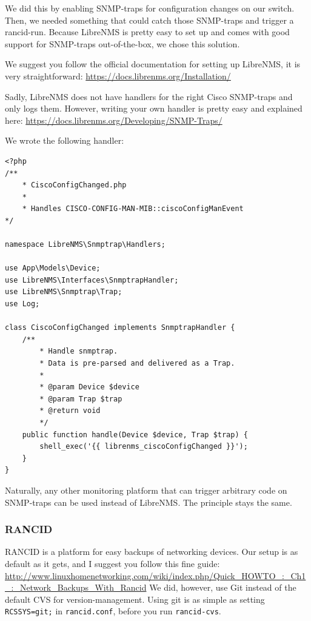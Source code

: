 \documentclass{article}
\begin{document}
We did this by enabling SNMP-traps for configuration changes on our switch.
Then, we needed something that could catch those SNMP-traps and trigger a rancid-run.
Because LibreNMS is pretty easy to set up and comes with good support for SNMP-traps out-of-the-box, we chose this solution.

We suggest you follow the official documentation for setting up LibreNMS,
it is very straightforward: \url{https://docs.librenms.org/Installation/}

Sadly, LibreNMS does not have handlers for the right Cisco SNMP-traps
and only logs them.
However, writing your own handler is pretty easy and explained here:
\url{https://docs.librenms.org/Developing/SNMP-Traps/}

We wrote the following handler:

\begin{minipage}{\linewidth}
\begin{lstlisting}[caption=LibreNMS SnmptrapHandler for CISCO-CONFIG-MAN-MIB::ciscoConfigManEvent]
<?php
/** 
	* CiscoConfigChanged.php
	* 
	* Handles CISCO-CONFIG-MAN-MIB::ciscoConfigManEvent
*/

namespace LibreNMS\Snmptrap\Handlers;

use App\Models\Device;
use LibreNMS\Interfaces\SnmptrapHandler;
use LibreNMS\Snmptrap\Trap;
use Log;

class CiscoConfigChanged implements SnmptrapHandler {
	/**
		* Handle snmptrap.
		* Data is pre-parsed and delivered as a Trap.
		* 
		* @param Device $device
		* @param Trap $trap
		* @return void
		*/
	public function handle(Device $device, Trap $trap) {
		shell_exec('{{ librenms_ciscoConfigChanged }}');
	}
} 
\end{lstlisting}
\end{minipage}

Naturally, any other monitoring platform that can trigger arbitrary code on SNMP-traps can be used instead of LibreNMS.
The principle stays the same.

\subsubsection{RANCID}
RANCID is a platform for easy backups of networking devices.
Our setup is as default as it gets, and I suggest you follow this fine guide:
\url{http://www.linuxhomenetworking.com/wiki/index.php/Quick_HOWTO_:_Ch1_:_Network_Backups_With_Rancid}
We did, however, use Git instead of the default CVS for version-management.
Using git is as simple as setting \verb|RCSSYS=git;| in \verb|rancid.conf|,
before you run \verb|rancid-cvs|.
\end{document}
